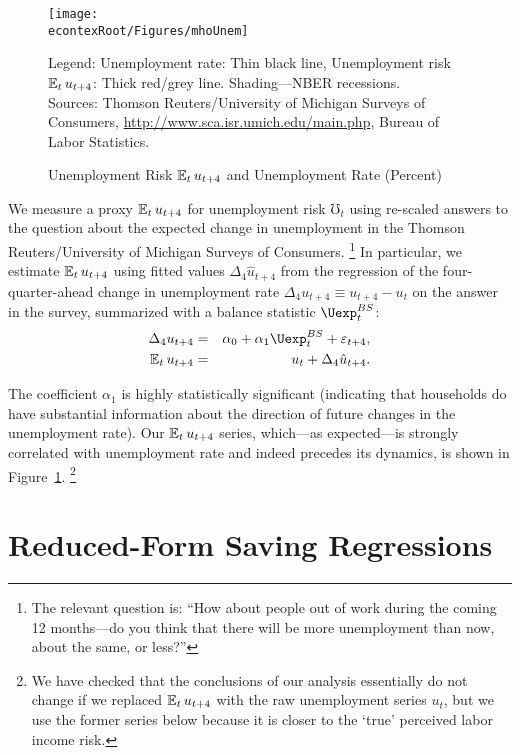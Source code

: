 \documentclass[titlepage]{\econtex}
\begin{document}
\hypertarget{mhoUnem}{}
\begin{figure}
\caption{Unemployment Risk $\operatorname{\mathbb{E}}_t u_{t+4}$ and Unemployment Rate (Percent)}
\label{fMho}
\texttt{[image: \\econtexRoot/Figures/mhoUnem]}

\footnotesize
Legend: Unemployment rate: Thin black line, Unemployment risk $\operatorname{\mathbb{E}}_t u_{t+4}$: Thick red/grey line. Shading---NBER recessions.\\[0mm]
\tiny Sources: Thomson Reuters/University of Michigan Surveys of Consumers, \url{http://www.sca.isr.umich.edu/main.php}, Bureau of Labor Statistics.
\end{figure}


We measure a proxy $\operatorname{\mathbb{E}}_t u_{t+4}$ for unemployment risk $\mho_t$ using re-scaled answers to the question about the expected change in unemployment in the Thomson Reuters/University of Michigan Surveys of Consumers.%
\footnote{The relevant question is: ``How about people out of work during the coming 12 months---do you think that there will be more unemployment than now, about the same, or less?''}
In particular, we estimate $\operatorname{\mathbb{E}}_t u_{t+4}$ using fitted values $\Delta_4 \hat{u}_{t+4}$ from the regression of the four-quarter-ahead change in unemployment rate $\Delta_4 u_{t+4}\equiv u_{t+4}-u_t$ on the answer in the survey, summarized with a balance statistic $\Uexp^{BS}_t$:
\begin{eqnarray*}
\Delta_4 u_{t+4} &=& \alpha_0+\alpha_1\Uexp^{BS}_t+\varepsilon_{t+4},\\
\Ex_t u_{t+4}&=&u_t+ \Delta_4 \hat{u}_{t+4}.
\end{eqnarray*}

The coefficient $\alpha_{1}$ is highly statistically significant (indicating that households do have substantial information about the direction of future changes in the unemployment rate).  Our $\operatorname{\mathbb{E}}_{t} u_{t+4}$ series, which---as expected---is strongly correlated with unemployment rate and indeed precedes its dynamics, is shown in Figure~\ref{fMho}.%
\footnote{We have checked that the conclusions of our analysis essentially do not change if we replaced $\operatorname{\mathbb{E}}_{t} u_{t+4}$ with the raw unemployment series $u_t$, but we use the former series below because it is closer to the `true' perceived labor income risk.
}


\section{Reduced-Form Saving Regressions } \label{sReducedFormRegressions}
\end{document}
